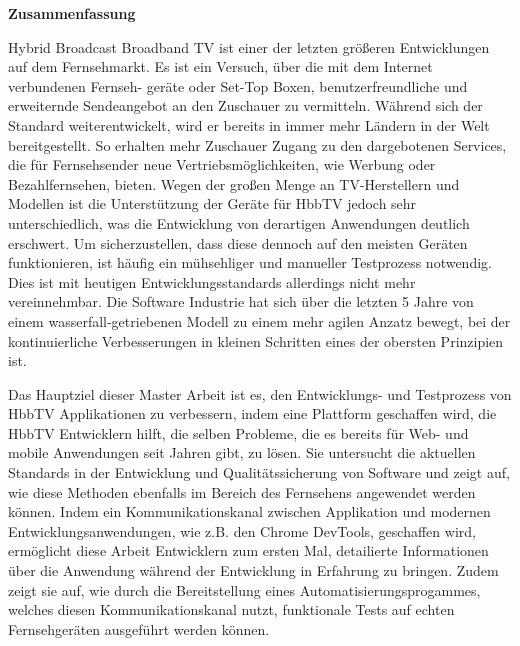 
\thispagestyle{empty}
\vspace*{0.2cm}

\begin{center}
    \textbf{Zusammenfassung}
\end{center}

\vspace*{0.2cm}

\noindent

Hybrid Broadcast Broadband TV ist einer der letzten größeren Entwicklungen auf dem Fernsehmarkt. Es ist ein Versuch, über die mit dem Internet verbundenen Fernseh- geräte oder Set-Top Boxen, benutzerfreundliche und erweiternde Sendeangebot an den Zuschauer zu vermitteln. Während sich der Standard weiterentwickelt, wird er bereits in immer mehr Ländern in der Welt bereitgestellt. So erhalten mehr Zuschauer Zugang zu den dargebotenen Services, die für Fernsehsender neue Vertriebsmöglichkeiten, wie Werbung oder Bezahlfernsehen, bieten. Wegen der großen Menge an TV-Herstellern und Modellen ist die Unterstützung der Geräte für HbbTV jedoch sehr unterschiedlich, was die Entwicklung von derartigen Anwendungen deutlich erschwert. Um sicherzustellen, dass diese dennoch auf den meisten Geräten funktionieren, ist häufig ein mühsehliger und manueller Testprozess notwendig. Dies ist mit heutigen Entwicklungsstandards allerdings nicht mehr vereinnehmbar. Die Software Industrie hat sich über die letzten 5 Jahre von einem wasserfall-getriebenen Modell zu einem mehr agilen Anzatz bewegt, bei der kontinuierliche Verbesserungen in kleinen Schritten eines der obersten Prinzipien ist.

Das Hauptziel dieser Master Arbeit ist es, den Entwicklungs- und Testprozess von HbbTV Applikationen zu verbessern, indem eine Plattform geschaffen wird, die HbbTV Entwicklern hilft, die selben Probleme, die es bereits für Web- und mobile Anwendungen seit Jahren gibt, zu lösen. Sie untersucht die aktuellen Standards in der Entwicklung und Qualitätssicherung von Software und zeigt auf, wie diese Methoden ebenfalls im Bereich des Fernsehens angewendet werden können. Indem ein Kommunikationskanal zwischen Applikation und modernen Entwicklungsanwendungen, wie z.B. den Chrome DevTools, geschaffen wird, ermöglicht diese Arbeit Entwicklern zum ersten Mal, detailierte Informationen über die Anwendung während der Entwicklung in Erfahrung zu bringen. Zudem zeigt sie auf, wie durch die Bereitstellung eines Automatisierungsprogammes, welches diesen Kommunikationskanal nutzt, funktionale Tests auf echten Fernsehgeräten ausgeführt werden können.

